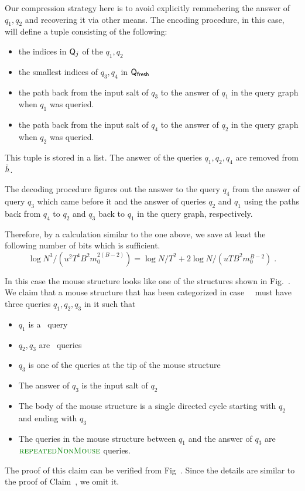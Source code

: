 {Our compression strategy here is to avoid explicitly remmebering the answer of $q_1,q_2$ and recovering it via other means.
The encoding procedure, in this case, will define a tuple consisting of the following:
\begin{itemize}
\item the indices in $\mathsf{Q}_j$ of the $q_1,q_2$
\item the smallest indices of $q_3,q_4$ in $\mathsf{Q}_\textsf{fresh}$
\item the path back from the input salt of $q_3$ to the answer of $q_1$ in the query graph when $q_1$ was queried. 
\item the path back from the input salt of $q_4$ to the answer of $q_2$ in the query graph when $q_2$ was queried. 
\end{itemize}
This tuple is stored in a list. The answer of the queries $q_1,q_2,q_4$ are removed from $\tilde{h}$.

The decoding procedure figures out the answer to the query $q_4$ from the answer of query $q_3$ which came before it and the answer of queries $q_2$ and $q_1$ using the paths back from $q_4$ to $q_2$ and $q_3$ back to $q_1$ in the query graph, respectively.

Therefore, by a calculation similar to the one above, we save at least the following number of bits which is sufficient. $$\log N^3/(u^2T^4B^2m_0^{2(B-2)})=\log N/T^2+2\log N/(uTB^2m_0^{B-2})\;.$$


In this case the mouse structure looks like one of the structures shown in Fig.~. We claim that a mouse structure that has been categorized in case~~ must have three queries $q_1,q_2,q_3$ in it such that
\begin{itemize}
\item $q_1$ is a \new\ query
\item $q_2,q_3$ are \urep\ queries
\item $q_3$ is one of the queries at the tip of the mouse structure
\item The answer of $q_3$ is the input salt of $q_2$
\item The body of the mouse structure is a single directed cycle starting with $q_2$ and ending with $q_3$
\item The queries in the mouse structure between $q_1$ and the answer of $q_3$ are $\urep$ queries.
\end{itemize}
The proof of this claim can be verified from Fig~. Since the details are similar to the proof of Claim~, we omit it.

}
